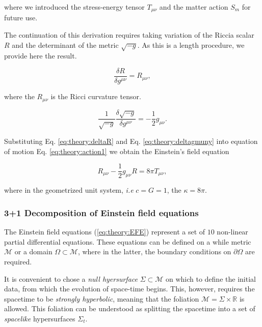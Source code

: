where we introduced the stress-energy tensor $T_{\mu\nu}$ and the matter action $S_m$ for future use. \\


The continuation of this derivation requires taking variation of the Riccia scalar $R$ and the determinant of the metric $\sqrt{-g}$. 
As this is a length procedure, we provide here the result. 

\begin{equation}
\frac{\delta R}{\delta g^{\mu\nu}} = R_{\mu\nu},
\label{eq:theory:deltaR}
\end{equation}

where the $R_{\mu\nu}$ is the Ricci curvature tensor.

\begin{equation}
\frac{1}{\sqrt{-g}}\frac{\delta\sqrt{-g}}{\delta g^{\mu\nu}} = -\frac{1}{2}g_{\mu\nu}.
\label{eq:theory:deltagmuny}
\end{equation}

Substituting Eq. \ref{eq:theory:deltaR} and Eq. \ref{eq:theory:deltagmuny} into equation of motion Eq.  \ref{eq:theory:action1} we obtain the Einstein's field equation 

\begin{equation}
R_{\mu\nu} -\frac{1}{2}g_{\mu\nu}R=8\pi T_{\mu\nu},
\label{eq:theory:EFE}
\end{equation}

where in the geometrized unit system, \textit{i.e} $c=G=1$, the $\kappa=8\pi$.

\subsubsection{3+1 Decomposition of Einstein field equations}

The Einstein field equations (\ref{eq:theory:EFE}) represent a set of $10$ non-linear partial differential equations.
These equations can be defined on a while metric $\mathcal{M}$ or a domain $\Omega\subset\mathcal{M}$, where in the latter, the boundary conditions on $\partial\Omega$ are required. 

It is convenient to chose a \textit{null hyersurface} $\Sigma\subset\mathcal{M}$ on which to define the initial data, from which the evolution of space-time begins. 
This, however, requires the spacetime to be \textit{strongly hyperbolic}, meaning that the foliation $\mathcal{M}=\Sigma\times\mathbb{R}$ is allowed. 
This foliation can be understood as splitting the spacetime into a set of \textit{spacelike} hypersurfaces $\Sigma_t$. 


